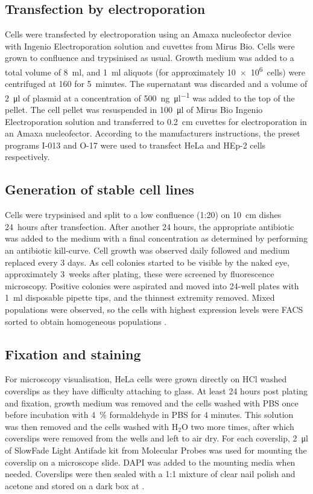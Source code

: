     \subsection{Transfection by electroporation}
      Cells were transfected by electroporation using an Amaxa nucleofector
      device with Ingenio Electroporation solution and cuvettes from Mirus Bio.
      Cells were grown to confluence and trypsinised as usual. Growth medium was
      added to a total volume of \SI{8}{\ml}, and \SI{1}{\ml} aliquots (for
      approximately \SI{10e6}{cells}) were centrifuged at \SI{160}{\gn} for 5~minutes.
      The supernatant was discarded and a volume of \SI{2}{\ul} of plasmid at
      a concentration of \SI{500}{\ng\per\ul} was added to the top of the pellet.
      The cell pellet was resuspended in \SI{100}{\ul} of Mirus Bio Ingenio
      Electroporation solution and transferred to \SI{0.2}{\cm} cuvettes for
      electroporation in an Amaxa nucleofector. According to the manufacturers
      instructions, the preset programs I-013 and O-17 were used to transfect
      HeLa and HEp-2 cells respectively.

    \subsection{Generation of stable cell lines}
      Cells were trypsinised and split to a low confluence (1:20) on
      \SI{10}{\cm} dishes 24~hours after transfection.  After another
      24 hours, the appropriate antibiotic was added to the medium
      with a final concentration as determined by performing an
      antibiotic kill-curve.  Cell
      growth was observed daily followed and medium replaced every 3
      days.  As cell colonies started to be visible by the naked eye,
      approximately 3~weeks after plating, these were screened by
      fluorescence microscopy.  Positive colonies were aspirated and
      moved into 24-well plates with \SI{1}{\ml} disposable pipette
      tips, and the thinnest extremity removed.  Mixed populations
      were observed, so the cells with highest expression levels were
      FACS sorted to obtain homogeneous populations
      .

    \subsection{Fixation and staining}
      For microscopy visualisation, HeLa cells were grown directly
      on HCl washed coverslips as they
      have difficulty attaching to glass. At least 24 hours post
      plating and fixation, growth medium was removed and the cells
      washed with PBS once before incubation with \SI{4}{\percent} formaldehyde in PBS
      for 4 minutes. This solution was then removed
      and the cells washed with H$_2$O two more
      times, after which coverslips were removed from the wells and left to air dry.
      For each coverslip, \SI{2}{\ul} of SlowFade Light Antifade kit from Molecular Probes
      was used for mounting the coverslip on a microscope slide. DAPI was added
      to the mounting media when needed. Coverslips were then sealed with a 1:1
      mixture of clear nail polish and acetone and stored on a dark box at .


